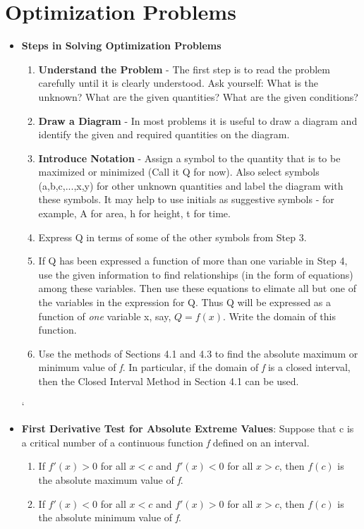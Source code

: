 \documentclass{report}
\begin{document}
		\section{Optimization Problems}
			\begin{itemize}\addtolength{\leftskip}{2em}
				\item \textbf{Steps in Solving Optimization Problems}
				\begin{enumerate}\addtolength{\leftskip}{4em}
				\item \textbf{Understand the Problem} - The first step is to read the problem carefully until it is clearly understood. Ask yourself: What is the unknown? What are the given quantities? What are the given conditions?
				\item \textbf{Draw a Diagram} - In most problems it is useful to draw a diagram and identify the given and required quantities on the diagram. 
				\item \textbf{Introduce Notation} - Assign a symbol to the quantity that is to be maximized or minimized (Call it Q for now). Also select symbols (a,b,c,...,x,y) for other unknown quantities and label the diagram with these symbols. It may help to use initials as suggestive symbols - for example, A for area, h for height, t for time.
				\item Express Q in terms of some of the other symbols from Step 3.
				\item If Q has been expressed a function of more than one variable in Step 4, use the given information to find relationships (in the form of equations) among these variables. Then use these equations to elimate all but one of the variables in the expression for Q. Thus Q will be expressed as a function of \textit{one} variable x, say, $Q=f(x)$. Write the domain of this function.
				\item Use the methods of Sections 4.1 and 4.3 to find the absolute maximum or minimum value of \textit{f}. In particular, if the domain of \textit{f} is a closed interval, then the Closed Interval Method in Section 4.1 can be used.
				\end{enumerate}`
				\item \textbf{First Derivative Test for Absolute Extreme Values}: Suppose that c is a critical number of a continuous function \textit{f} defined on an interval.
				\begin{enumerate}\addtolength{\leftskip}{4em}
				\item If $f'(x)>0$ for all $x<c$ and $f'(x)<0$ for all $x>c$, then $f(c)$ is the absolute maximum value of \textit{f}.
				\item If $f'(x)<0$ for all $x<c$ and $f'(x)>0$ for all $x>c$, then $f(c)$ is the absolute minimum value of \textit{f}.
				\end{enumerate}
			\end{itemize}
			\setcounter{section}{+8}
\end{document}
